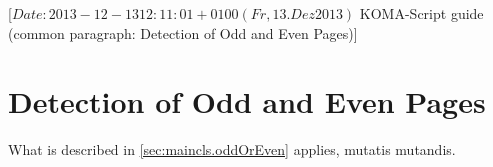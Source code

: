 %
%
%
%
%
%
%
%
% 
%
%
%
%

                 [$Date: 2013-12-13 12:11:01 +0100 (Fr, 13. Dez 2013) $
                  KOMA-Script guide (common paragraph: Detection of Odd and
                                     Even Pages)]


\makeatletter
{}%
%
%
%
\makeatother


\section{Detection of Odd and Even Pages}
\label{sec:\csname label@base\endcsname.oddOrEven}%
\ifshortversion\IgnoreThisfalse{}\fi%
\ifIgnoreThis %
What is described in
\autoref{sec:maincls.oddOrEven} applies, mutatis mutandis.
\else %
%
%

